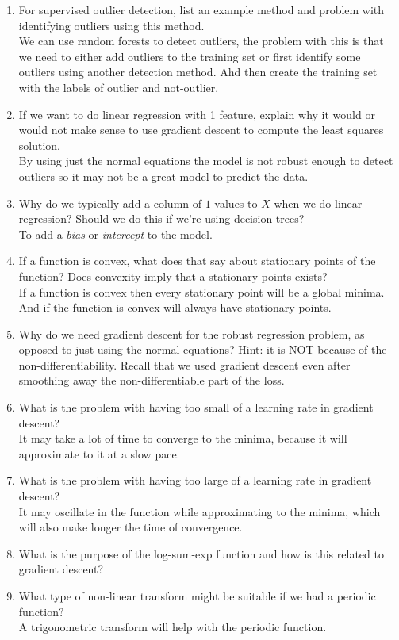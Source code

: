 \documentclass{article}
\def\ans#1{{\color{ans}#1}}
\begin{document}
\begin{enumerate}
{}
\item For supervised outlier detection, list an example method and problem with identifying outliers using this method.\\
\ans{
    We can use random forests to detect outliers, the problem with this is that we need to either 
    add outliers to the training set or first identify some outliers using another detection method. 
    Ahd then create the training set with the labels of outlier and not-outlier.
}
\item If we want to do linear regression with 1 feature, explain why it would or would not make sense to use gradient descent to compute the least squares solution.\\
\ans{
    By using just the normal equations the model is not robust enough to detect outliers so it may 
    not be a great model to predict the data.
}
\item Why do we typically add a column of $1$ values to $X$ when we do linear regression? Should we do this if we're using decision trees?\\
\ans{
    To add a \emph{bias} or \emph{intercept} to the model.
}
\item If a function is convex, what does that say about stationary points of the function? Does convexity imply that a stationary points exists?\\
\ans{
    If a function is convex then every stationary point will be a global minima. And if the function is 
    convex will always have stationary points.
}
\item Why do we need gradient descent for the robust regression problem, as opposed to just using the normal equations? Hint: it is NOT because of the non-differentiability. Recall that we used gradient descent even after smoothing away the non-differentiable part of the loss.\\
\ans{
}
\item What is the problem with having too small of a learning rate in gradient descent?\\
\ans{
    It may take a lot of time to converge to the minima, because it will approximate to it at a 
    slow pace.
}
\item What is the problem with having too large of a learning rate in gradient descent?\\
\ans{
    It may oscillate in the function while approximating to the minima, which will also make longer 
    the time of convergence.
}
\item What is the purpose of the log-sum-exp function and how is this related to gradient descent?\\
\ans{
}
\item What type of non-linear transform might be suitable if we had a periodic function?\\
\ans{
    A trigonometric transform will help with the periodic function.
}
\end{enumerate}
\end{document}
